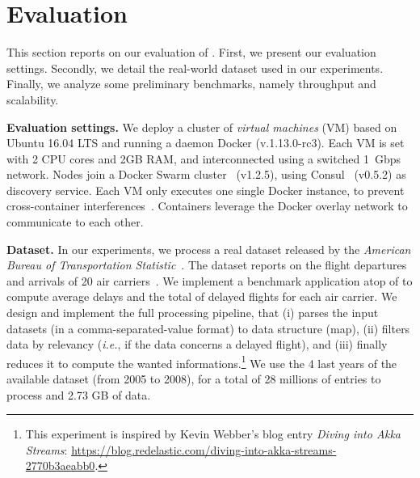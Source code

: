 \section{Evaluation}
\label{sec:eval}

This section reports on our evaluation of \SYS.
First, we present our evaluation settings.
Secondly, we detail the real-world dataset used in our experiments.
Finally, we analyze some preliminary benchmarks, namely throughput and scalability.

\textbf{Evaluation settings.}
We deploy a cluster of \emph{virtual machines} (VM) based on Ubuntu 16.04 LTS  and running a daemon Docker (v.1.13.0-rc3).
Each VM is set with 2 CPU cores and 2GB RAM, and interconnected using a switched 1~Gbps network.
Nodes join a Docker Swarm cluster~\cite{docker:swarm_2016} (v1.2.5), using Consul~\cite{consul} (v0.5.2) as discovery service.
Each VM only executes one single Docker instance, to prevent cross-container interferences~\cite{koh2007analysis}.
Containers leverage the Docker overlay network to communicate to each other.

\textbf{Dataset.} In our experiments, we process a real dataset released by the \emph{American Bureau of Transportation Statistic}~\cite{rita:bts}.
The dataset reports on the flight departures and arrivals of 20 air carriers~\cite{statistical_computing:data}.
We implement a benchmark application atop of \SYS to compute average delays and the total of delayed flights for each air carrier.
We design and implement the full processing pipeline, that (i) parses the input datasets (in a comma-separated-value format) to data structure (\textsf{map}), (ii) filters data by relevancy (\emph{i.e.}, if the data concerns a delayed flight), and (iii) finally reduces it to compute the wanted informations.\footnote{This experiment is inspired by Kevin Webber's blog entry \emph{Diving into Akka Streams}: \url{https://blog.redelastic.com/diving-into-akka-streams-2770b3aeabb0}.}
We use the 4 last years of the available dataset (from 2005 to 2008), for a total of 28 millions of entries to process and 2.73 GB of data.

